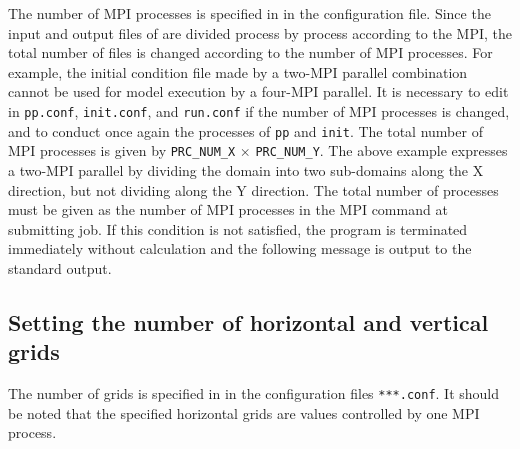 The number of MPI processes is specified in  in the configuration file. Since the input and output files of \scalerm are divided process by process according to the MPI, the total number of files is changed according to the number of MPI processes. For example, the initial condition file made by a two-MPI parallel combination cannot be used for model execution by a four-MPI parallel.
It is necessary to edit  in \verb|pp.conf|, \verb|init.conf|, and \verb|run.conf| if the number of MPI processes is changed,
and to conduct once again the processes of \verb|pp| and \verb|init|.
The total number of MPI processes is given by \verb|PRC_NUM_X| $\times$ \verb|PRC_NUM_Y|.
The above example expresses a two-MPI parallel by dividing the domain into two sub-domains along the X direction, but not dividing along the Y direction. The total number of processes must be given as the number of MPI processes in the MPI command at submitting job. If this condition is not satisfied,  the program is terminated immediately without calculation and the following message is output to the standard output.

\subsection{Setting the number of horizontal and vertical grids} \label{subsec:relation_dom_reso3}

The number of grids is specified in  in the configuration files \verb|***.conf|. It should be noted that the specified horizontal grids are values controlled by one MPI process.

